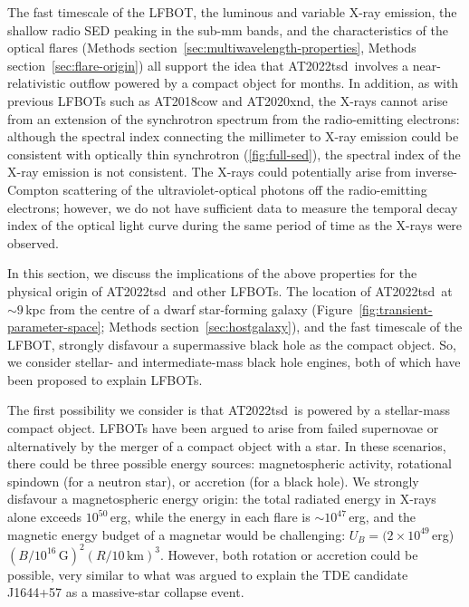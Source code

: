 \documentclass{nature_plusfigure}
\newcommand{\at}{AT2022tsd}
\begin{document}
\begin{methods}
The fast timescale of the LFBOT, the luminous and variable X-ray emission, the shallow radio SED peaking in the sub-mm bands, and the characteristics of the optical flares (Methods section~\ref{sec:multiwavelength-properties}, Methods section~\ref{sec:flare-origin}) all support the idea that \at\ involves a near-relativistic outflow powered by a compact object for months.
In addition, as with previous LFBOTs such as AT2018cow and AT2020xnd, the X-rays cannot arise from an extension of the synchrotron spectrum from the radio-emitting electrons\cite{Margutti2019,Ho2019,Ho2022_AT2020xnd}: although the spectral index connecting the millimeter to X-ray emission could be consistent with optically thin synchrotron (\ref{fig:full-sed}), the spectral index of the X-ray emission is not consistent.
The X-rays could potentially arise from inverse-Compton scattering of the ultraviolet-optical photons off the radio-emitting electrons; however, we do not have sufficient data to measure the temporal decay index of the optical light curve during the same period of time as the X-rays were observed.

In this section, we discuss the implications of the above properties for the physical origin of \at\ and other LFBOTs. The location of \at\ at $\sim9\,$kpc from the centre of a dwarf star-forming galaxy (Figure~\ref{fig:transient-parameter-space}; Methods section~\ref{sec:hostgalaxy}), and the fast timescale of the LFBOT, strongly disfavour a supermassive black hole as the compact object. So, we consider stellar- and intermediate-mass black hole engines, both of which have been proposed to explain LFBOTs\cite{Perley2019,Margutti2019,Metzger2022,Chen2023b}. 

The first possibility we consider is that \at\ is powered by a stellar-mass compact object. LFBOTs have been argued to arise from failed supernovae\cite{Perley2019,Margutti2019} or alternatively by the merger of a compact object with a star\cite{Metzger2022}. In these scenarios, there could be three possible energy sources: magnetospheric activity, rotational spindown (for a neutron star), or accretion (for a black hole). We strongly disfavour a magnetospheric energy origin: the total radiated energy in X-rays alone exceeds $10^{50}\,$erg, while the energy in each flare is $\sim10^{47}\,$erg, and the magnetic energy budget of a magnetar would be challenging: $U_B = (2\times10^{49}\,$erg)$(B/10^{16}\,\mathrm{G})^2 (R/10\,\mathrm{km})^3$. However, both rotation or accretion could be possible, very similar to what was argued to explain the TDE candidate J1644+57 as a massive-star collapse event\cite{Quataert2012}. 


\end{methods}
\end{document}
